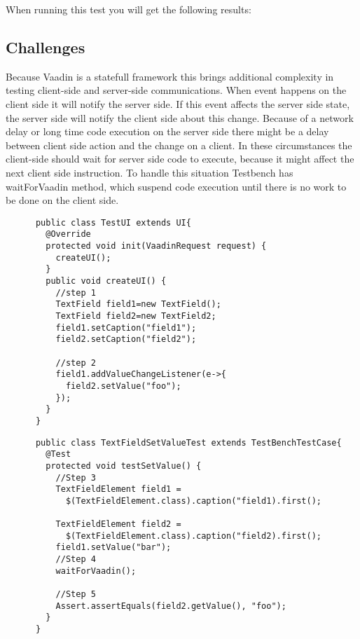 	When running this test you will get the following results:
\subsection {Challenges}
Because Vaadin is a statefull framework this brings additional complexity in
testing client-side and server-side communications. When event happens on the client side 
it will notify the server side. If this event affects the server side state, the
server side will notify the client side about this change.
 Because of a network delay or long time code execution on the server side there might be a delay between 
 client side action and the change on a client.  
 In these circumstances the client-side should wait for server side code to execute,
  because it might affect the next client side instruction.
  To handle this situation Testbench has waitForVaadin method, which suspend code execution until 
  there is no work to be done on the client side.
      
  
    \lstset{language=Java}
    \begin{lstlisting}
      public class TestUI extends UI{
        @Override
        protected void init(VaadinRequest request) {
          createUI();
        }
        public void createUI() {
          //step 1 
          TextField field1=new TextField();
          TextField field2=new TextField2;
          field1.setCaption("field1");
          field2.setCaption("field2");
          
          //step 2
          field1.addValueChangeListener(e->{
            field2.setValue("foo");
          });
        }
      }
    \end{lstlisting}  
    
    \lstset{language=Java}
    \begin{lstlisting}
      public class TextFieldSetValueTest extends TestBenchTestCase{
        @Test
        protected void testSetValue() {
          //Step 3
          TextFieldElement field1 =
            $(TextFieldElement.class).caption("field1).first();
            
          TextFieldElement field2 =
            $(TextFieldElement.class).caption("field2).first();  
          field1.setValue("bar");
          //Step 4
          waitForVaadin();
          
          //Step 5
          Assert.assertEquals(field2.getValue(), "foo");           
        }
      }
    \end{lstlisting}  
